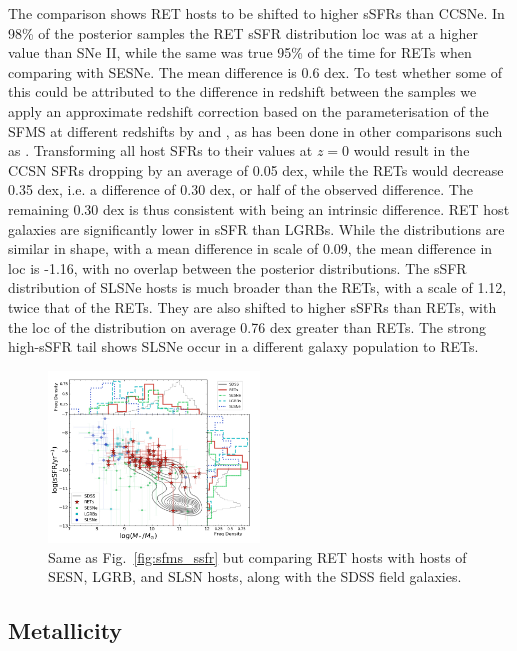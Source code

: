 \documentclass[fleqn,usenatbib,]{mnras}
\begin{document}
The comparison shows RET hosts to be shifted to higher sSFRs than CCSNe. In 98\% of the posterior samples the RET sSFR distribution loc was at a higher value than SNe II, while the same was true 95\% of the time for RETs when comparing with SESNe. The mean difference is 0.6 dex. To test whether some of this could be attributed to the difference in redshift between the samples we apply an approximate redshift correction based on the parameterisation of the SFMS at different redshifts by \citet{Salim2007} and \citet{Noeske2007}, as has been done in other comparisons such as \citet{Taggart2019}. Transforming all host SFRs to their values at $z=0$ would result in the CCSN SFRs dropping by an average of 0.05 dex, while the RETs would decrease 0.35 dex, i.e. a difference of 0.30 dex, or half of the observed difference. The remaining 0.30 dex is thus consistent with being an intrinsic difference. 
RET host galaxies are significantly lower in sSFR than LGRBs. While the distributions are similar in shape, with a mean difference in scale of 0.09, the mean difference in loc is -1.16, with no overlap between the posterior distributions. The sSFR distribution of SLSNe hosts is much broader than the RETs, with a scale of 1.12, twice that of the RETs. They are also shifted to higher sSFRs than RETs, with the loc of the distribution on average 0.76 dex greater than RETs. The strong high-sSFR tail shows SLSNe occur in a different galaxy population to RETs.

\begin{figure}
\includegraphics[width=0.5\textwidth]{figs/sSFR_Mike_other.png}
\caption{Same as Fig.~\ref{fig:sfms_ssfr} but comparing RET hosts with hosts of SESN, LGRB, and SLSN hosts, along with the SDSS field galaxies.
\label{fig:sfms_ssfr_other}}
\end{figure}

\subsection{Metallicity \label{subsec:res_metallicity}}
\end{document}
